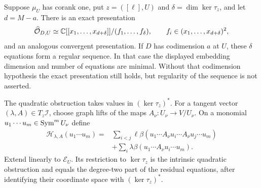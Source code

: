 \begin{theorem}
\label{thm:minimal-residual-equations}
Suppose $\mu_U$ has corank one, put $z=([\ell],U)$ and
$\delta=\dim\ker\tau_z$, and let $d=M-a$. There is an exact
presentation
\begin{equation}\label{eq:minimal-residual-local-ring}
 \widehat{\mathcal O}_{D,U}
       \simeq\mathbb C[[x_1,\ldots,x_{d+\delta}]]/(f_1,\ldots,f_\delta),
       \qquad f_i\in(x_1,\ldots,x_{d+\delta})^2,
\end{equation}
and an analogous convergent presentation. If $D$ has codimension
$a$ at $U$, these $\delta$ equations form a regular sequence. In
that case the displayed embedding dimension and number of equations
are minimal. Without that codimension hypothesis the exact
presentation still holds, but regularity of the sequence is not
asserted.

The quadratic obstruction takes values in $(\ker\tau_z)^*$.
For a tangent vector $(\lambda,A)\in T_z\mathcal I$, choose graph
lifts of the maps $A_\nu:U_\nu\to V/U_\nu$. On a monomial
$u_1\cdots u_m\in\operatorname{Sym}^mU_\nu$ define
\begin{equation}\label{eq:quadratic-polar-obstruction}
 \begin{split}
 \mathcal H_{\lambda,A}(u_1\cdots u_m)
 ={}&\sum_{i<j}\ell\beta(u_1\cdots A_\nu u_i\cdots
                                A_\nu u_j\cdots u_m)\\
 &+\sum_i\lambda\beta(u_1\cdots A_\nu u_i\cdots u_m).
 \end{split}
\end{equation}
Extend linearly to $\mathcal E_U$. Its restriction to
$\ker\tau_z$ is the intrinsic quadratic obstruction and equals the
degree-two part of the residual equations, after identifying their
coordinate space with $(\ker\tau_z)^*$.
\end{theorem}
